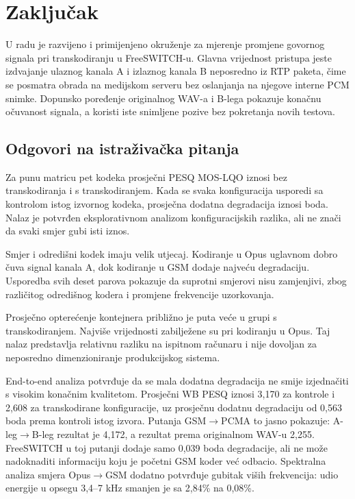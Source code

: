 \chapter{Zaključak}
\label{ch:zakljucak}

U radu je razvijeno i primijenjeno okruženje za mjerenje promjene govornog signala pri transkodiranju u FreeSWITCH-u. Glavna vrijednost pristupa jeste izdvajanje ulaznog kanala A i izlaznog kanala B neposredno iz RTP paketa, čime se posmatra obrada na medijskom serveru bez oslanjanja na njegove interne PCM snimke. Dopunsko poređenje originalnog WAV-a i B-lega pokazuje konačnu očuvanost signala, a koristi iste snimljene pozive bez pokretanja novih testova.

\section{Odgovori na istraživačka pitanja}

Za punu matricu pet kodeka prosječni PESQ MOS-LQO iznosi \PassthroughPESQ{} bez transkodiranja i \TranscodePESQ{} s transkodiranjem. Kada se svaka konfiguracija usporedi sa kontrolom istog izvornog kodeka, prosječna dodatna degradacija iznosi \RazlikaPESQ{} boda. Nalaz je potvrđen eksplorativnom analizom konfiguracijskih razlika, ali ne znači da svaki smjer gubi isti iznos.

Smjer i odredišni kodek imaju velik utjecaj. Kodiranje u Opus uglavnom dobro čuva signal kanala A, dok kodiranje u GSM dodaje najveću degradaciju. Usporedba svih deset parova pokazuje da suprotni smjerovi nisu zamjenjivi, zbog različitog odredišnog kodera i promjene frekvencije uzorkovanja.

Prosječno opterećenje kontejnera približno je \OmjerCPU{} puta veće u grupi s transkodiranjem. Najviše vrijednosti zabilježene su pri kodiranju u Opus. Taj nalaz predstavlja relativnu razliku na ispitnom računaru i nije dovoljan za neposredno dimenzioniranje produkcijskog sistema.

End-to-end analiza potvrđuje da se mala dodatna degradacija ne smije izjednačiti s visokim konačnim kvalitetom. Prosječni WB PESQ iznosi 3,170 za kontrole i 2,608 za transkodirane konfiguracije, uz prosječnu dodatnu degradaciju od 0,563 boda prema kontroli istog izvora. Putanja GSM$\rightarrow$PCMA to jasno pokazuje: A-leg$\rightarrow$B-leg rezultat je 4,172, a rezultat prema originalnom WAV-u 2,255. FreeSWITCH u toj putanji dodaje samo 0,039 boda degradacije, ali ne može nadoknaditi informaciju koju je početni GSM koder već odbacio. Spektralna analiza smjera Opus$\rightarrow$GSM dodatno potvrđuje gubitak viših frekvencija: udio energije u opsegu 3,4--7 kHz smanjen je sa 2,84\% na 0,08\%.

